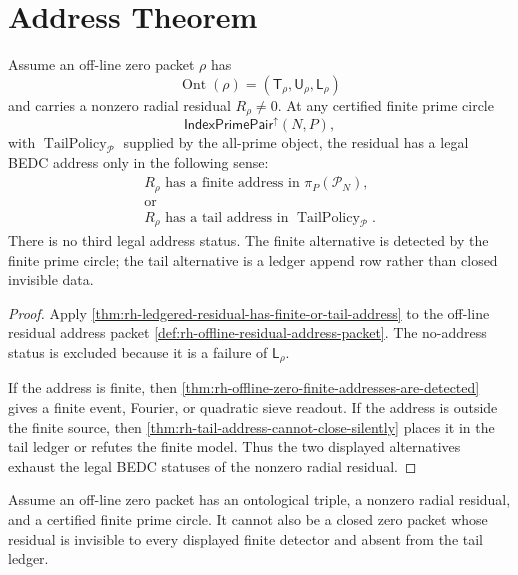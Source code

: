 \section{Address Theorem}
\label{sec:rh-offline-zero-finite-or-tail-address-theorem}

\begin{theorem}[OffLineZeroHasFiniteOrTailAddress]
\label{thm:rh-offline-zero-has-finite-or-tail-address}
Assume an off-line zero packet $\rho$ has
$$
\operatorname{Ont}(\rho)
=
(\mathsf T_\rho,\mathsf U_\rho,\mathsf L_\rho)
$$
and carries a nonzero radial residual $R_\rho\ne0$.  At any certified
finite prime circle
$$
\mathsf{IndexPrimePair}^{\uparrow}(N,P),
$$
with $\operatorname{TailPolicy}_{\mathcal P}$ supplied by the
all-prime object,
the residual has a legal BEDC address only in the following sense:
$$
\begin{gathered}
R_\rho\text{ has a finite address in }\pi_P(\mathcal P_N),\\
\text{or}\\
R_\rho\text{ has a tail address in }
\operatorname{TailPolicy}_{\mathcal P}.
\end{gathered}
$$
There is no third legal address status.  The finite alternative is
detected by the finite prime circle; the tail alternative is a ledger
append row rather than closed invisible data.
\end{theorem}

\begin{proof}
Apply
\autoref{thm:rh-ledgered-residual-has-finite-or-tail-address} to the
off-line residual address packet
\autoref{def:rh-offline-residual-address-packet}.  The no-address
status is excluded because it is a failure of $\mathsf L_\rho$.

If the address is finite, then
\autoref{thm:rh-offline-zero-finite-addresses-are-detected} gives a
finite event, Fourier, or quadratic sieve readout.  If the address is
outside the finite source, then
\autoref{thm:rh-tail-address-cannot-close-silently} places it in the
tail ledger or refutes the finite model.  Thus the two displayed
alternatives exhaust the legal BEDC statuses of the nonzero radial
residual.
\end{proof}

\begin{corollary}
\label{cor:rh-closed-invisible-offline-residual-contradiction}
Assume an off-line zero packet has an ontological triple, a nonzero
radial residual, and a certified finite prime circle.  It cannot also
be a closed zero packet whose residual is invisible to every displayed
finite detector and absent from the tail ledger.
\end{corollary}

